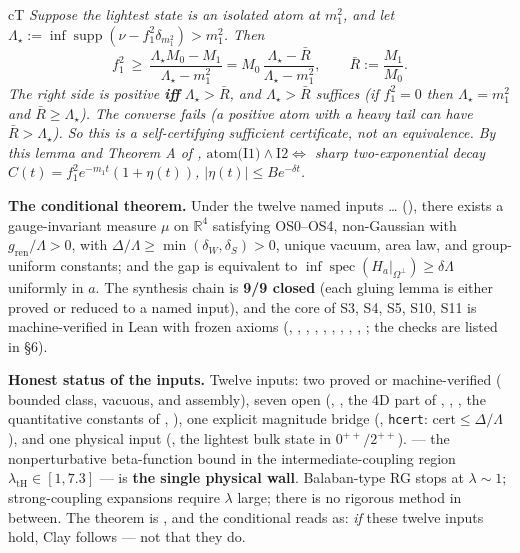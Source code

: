 \begin{claimbox}{cT}
 \emph{Suppose the lightest state is an isolated atom at
$m_1^2$, and let
$\Lambda_{\star}:=\inf\operatorname{supp}(\nu-f_1^2\delta_{m_1^2})>m_1^2$. Then}
\begin{equation}
f_1^2\ \ge\ \frac{\Lambda_{\star} M_0-M_1}{\Lambda_{\star}-m_1^2}
= M_0\,\frac{\Lambda_{\star}-\bar R}{\Lambda_{\star}-m_1^2},
\qquad \bar R:=\frac{M_1}{M_0}.
\label{eq:reslevel}
\end{equation}
\emph{The right side is positive \textbf{iff} $\Lambda_{\star}>\bar R$, and $\Lambda_{\star}>\bar R$ suffices
(if $f_1^2=0$ then $\Lambda_{\star}=m_1^2$ and $\bar R\ge\Lambda_{\star}$). The converse fails (a positive atom
with a heavy tail can have $\bar R>\Lambda_{\star}$). So this is a self-certifying sufficient
certificate, not an equivalence. By this lemma and Theorem A of ,
$\text{atom(I1)}\wedge\text{I2}\iff$ sharp two-exponential decay
$C(t)=f_1^2e^{-m_1t}(1+\eta(t))$, $|\eta(t)|\le Be^{-\delta t}$.}

\smallskip
\textbf{The conditional theorem.} Under the twelve named inputs  \ldots{} 
(), there exists a gauge-invariant measure $\mu$ on
$\mathbb{R}^4$ satisfying OS0--OS4, non-Gaussian with $g_{\mathrm{ren}}/\Lambda>0$, with
$\Delta/\Lambda\ge\min(\delta_W,\delta_S)>0$, unique vacuum, area law, and group-uniform
constants; and the gap is equivalent to
$\inf\operatorname{spec}(H_a|_{\Omega^\perp})\ge\delta\Lambda$ uniformly in $a$. The synthesis
chain is \textbf{9/9 closed} (each gluing lemma is either proved or reduced to a named input),
and the core of S3, S4, S5, S10, S11 is machine-verified in Lean with frozen axioms
(, , ,
, , , ,
, , ; the checks are listed
in  \S6).

\smallskip
\textbf{Honest status of the inputs.} Twelve inputs: two proved or machine-verified
( bounded class, vacuous, and  assembly), seven open (,
, the 4D part of , , , the quantitative constants of
, ), one explicit magnitude bridge (,
\texttt{hcert}: $\text{cert}\le\Delta/\Lambda$), and one physical input (, the
lightest bulk state in $0^{++}/2^{++}$).  --- the nonperturbative beta-function bound
in the intermediate-coupling region $\lambda_{\mathrm{tH}}\in[1,7.3]$ --- is \textbf{the single physical wall}.
Balaban-type RG stops at $\lambda\sim1$; strong-coupling expansions require $\lambda$ large;
there is no rigorous method in between. The theorem is \LC, and the conditional reads as:
\emph{if} these twelve inputs hold, Clay follows --- not that they do.


\end{claimbox}
